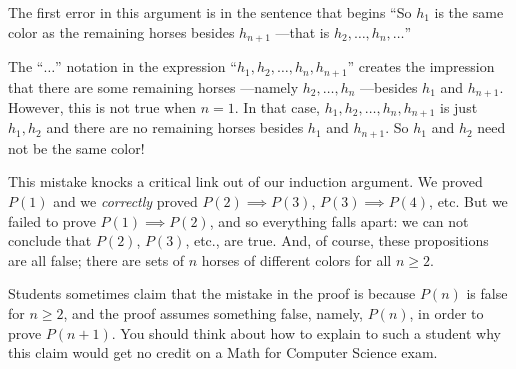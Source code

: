 The first error in this argument is in the sentence that begins ``So
$h_1$ is the same color as the remaining horses besides $h_{n+1}$
---that is $h_2, \dots, h_n, \dots$''

The ``$\dots$'' notation in the expression ``$h_1, h_2, \dots, h_n,
h_{n+1}$'' creates the impression that there are some remaining horses
---namely $h_2, \dots, h_n$ ---besides $h_1$ and $h_{n+1}$.  However,
this is not true when $n = 1$.  In that case, $h_1, h_2, \dots, h_n,
h_{n+1}$ is just $h_1, h_2$ and there are no remaining horses besides
$h_1$ and $h_{n+1}$.  So $h_1$ and $h_2$ need not be the same color!


This mistake knocks a critical link out of our induction argument.  We
proved $P(1)$ and we \emph{correctly} proved $P(2) \implies P(3)$, $P(3)
\implies P(4)$, etc.  But we failed to prove $P(1) \implies P(2)$, and so
everything falls apart: we can not conclude that $P(2)$, $P(3)$, etc., are
true.  And, of course, these propositions are all false; there are
sets of $n$ horses of different colors for all $n \ge 2$.


Students sometimes claim that the mistake in the proof is because
$P(n)$ is false for $n \geq 2$, and the proof assumes something false,
namely, $P(n)$, in order to prove $P(n+1)$.  You should think about
how to explain to such a student why this claim would get no credit on
a Math for Computer Science exam.

\begin{problems}
\classproblems
{}
\homeworkproblems
{}
\end{problems}



